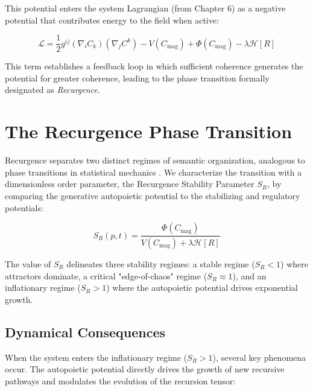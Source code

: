 This potential enters the system Lagrangian (from Chapter 6) as a negative potential that contributes energy to the field when active:

\begin{equation}
\mathcal{L} = \frac{1}{2} g^{ij} (\nabla_i C_k)(\nabla_j C^k) - V(C_{\mathrm{mag}}) + \Phi(C_{\mathrm{mag}}) - \lambda \mathcal{H}[R]
\end{equation}

This term establishes a feedback loop in which sufficient coherence generates the potential for greater coherence, leading to the phase transition formally designated as \textit{Recurgence}.


\section{The Recurgence Phase Transition}
\label{sec:the_recurgence_phase_transition}

Recurgence separates two distinct regimes of semantic organization, analogous to phase transitions in statistical mechanics \autocite{Landau1937, Stanley1971, Goldenfeld1992}. We characterize the transition with a dimensionless order parameter, the Recurgence Stability Parameter \(S_R\), by comparing the generative autopoietic potential to the stabilizing and regulatory potentials:

\begin{equation}
S_R(p,t) = \frac{\Phi(C_{\mathrm{mag}})}{V(C_{\mathrm{mag}}) + \lambda \mathcal{H}[R]}
\end{equation}

The value of \(S_R\) delineates three stability regimes: a stable regime (\(S_R < 1\)) where attractors dominate, a critical "edge-of-chaos" regime (\(S_R \approx 1\)), and an inflationary regime (\(S_R > 1\)) where the autopoietic potential drives exponential growth.


\subsection{Dynamical Consequences}
\label{sec:dynamical_consequences}

When the system enters the inflationary regime (\(S_R > 1\)), several key phenomena occur. The autopoietic potential directly drives the growth of new recursive pathways and modulates the evolution of the recursion tensor:

